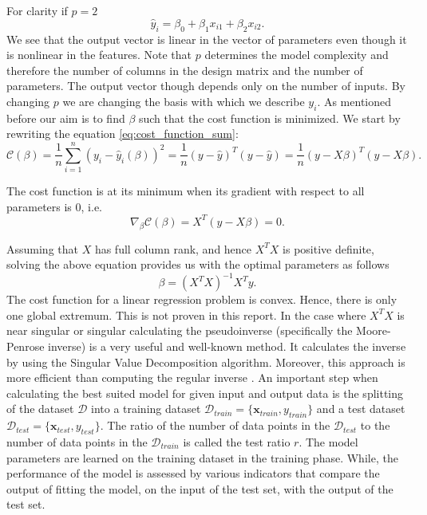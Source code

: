 For clarity if $p=2$
\begin{equation*}
    \hat{y}_i = \beta_0+\beta_1 x_{i1} + \beta_2 x_{i2}.
\end{equation*}
We see that the output vector is linear in the vector of parameters even though it is nonlinear in the features. Note that $p$ determines the model complexity and therefore the number of columns in the design matrix and the number of parameters. The output vector though depends only on the number of inputs. By changing $p$ we are changing the basis with which we describe $y_i$. 
\newline \newline
As mentioned before our aim is to find $\beta$ such that the cost function is minimized. We start by rewriting the equation \ref{eq:cost_function_sum}:
\begin{equation}
    \mathcal{C}(\beta) = \frac{1}{n}\sum_{i=1}^{n}(y_i-\hat{y}_i(\beta))^2 = \frac{1}{n}( y -  {\hat y})^T( y -  {\hat y}) = \frac{1}{n}( y -  {X\beta})^T( y -  {X\beta}).
\end{equation}

The cost function is at its minimum when its gradient with respect to all parameters is 0, i.e.
\begin{equation*}
    \nabla_{\beta}\mathcal{C}(\beta) = X^T(y-X\beta) = 0.
\end{equation*}

Assuming that $X$ has full column rank, and hence $X^T X$ is positive definite, solving the above equation provides us with the optimal parameters as follows
\begin{equation}
    \beta = (X^TX)^{-1}X^Ty.
\end{equation}
The cost function for a linear regression problem is convex. Hence, there is only one global extremum. This is not proven in this report.
\newline \newline
In the case where $X^T X$ is near singular or singular calculating the pseudoinverse (specifically the
Moore-Penrose inverse) is a very useful and well-known method. It calculates the inverse by using the Singular Value Decomposition algorithm. Moreover, this approach is more efficient than computing the regular inverse \cite{geron_hands-machine_2019}.
\newline \newline
An important step when calculating the best suited model for given input and output data is the splitting of the dataset $\mathcal{D}$ into a training dataset $\mathcal{D}_{train} = \{\boldsymbol{x}_{train}, y_{train}\}$ and a test dataset $\mathcal{D}_{test} = \{\boldsymbol{x}_{test}, y_{test}\}$. The ratio of the number of data points in the $\mathcal{D}_{test}$ to the number of data points in the $\mathcal{D}_{train}$ is called the test ratio $r$. The model parameters are learned on the training dataset in the training phase. While, the performance of the model is assessed by various indicators that compare the output of fitting the model, on the input of the test set, with the output of the test set. \newline

